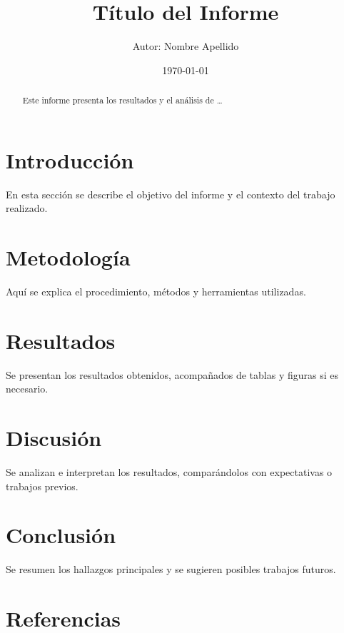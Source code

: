 \documentclass[a4paper,12pt]{article}
\title{Título del Informe}
\author{Autor: Nombre Apellido}
\date{\today}
\begin{document}
\maketitle

\begin{abstract}
Este informe presenta los resultados y el análisis de \ldots
\end{abstract}

\section{Introducción}
En esta sección se describe el objetivo del informe y el contexto del trabajo realizado.

\section{Metodología}
Aquí se explica el procedimiento, métodos y herramientas utilizadas.

\section{Resultados}
Se presentan los resultados obtenidos, acompañados de tablas y figuras si es necesario.

\section{Discusión}
Se analizan e interpretan los resultados, comparándolos con expectativas o trabajos previos.

\section{Conclusión}
Se resumen los hallazgos principales y se sugieren posibles trabajos futuros.

\section*{Referencias}


\end{document}
